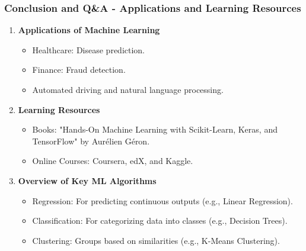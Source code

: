 \documentclass[aspectratio=169]{beamer}
\begin{document}
\begin{frame}[fragile]
    \frametitle{Conclusion and Q\&A - Applications and Learning Resources}
    \begin{enumerate}[resume]
        \item \textbf{Applications of Machine Learning}
            \begin{itemize}
                \item Healthcare: Disease prediction.
                \item Finance: Fraud detection.
                \item Automated driving and natural language processing.
            \end{itemize}

        \item \textbf{Learning Resources}
            \begin{itemize}
                \item Books: "Hands-On Machine Learning with Scikit-Learn, Keras, and TensorFlow" by Aurélien Géron.
                \item Online Courses: Coursera, edX, and Kaggle.
            \end{itemize}

        \item \textbf{Overview of Key ML Algorithms}
            \begin{itemize}
                \item Regression: For predicting continuous outputs (e.g., Linear Regression).
                \item Classification: For categorizing data into classes (e.g., Decision Trees).
                \item Clustering: Groups based on similarities (e.g., K-Means Clustering).
            \end{itemize}
    \end{enumerate}
\end{frame}
\end{document}
